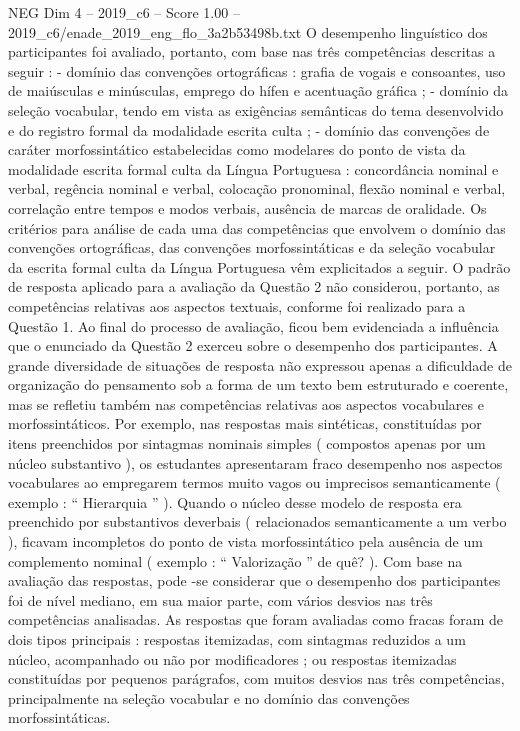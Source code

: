 \begin{textsample}{NEG Dim 4 – 2019\_c6 – Score 1.00 – 2019\_c6/enade\_2019\_eng\_flo\_3a2b53498b.txt}
O desempenho linguístico dos participantes foi avaliado, portanto, com base nas três competências descritas a seguir : - domínio das convenções ortográficas : grafia de vogais e consoantes, uso de maiúsculas e minúsculas, emprego do hífen e acentuação gráfica ; - domínio da seleção vocabular, tendo em vista as exigências semânticas do tema desenvolvido e do registro formal da modalidade escrita culta ; - domínio das convenções de caráter morfossintático estabelecidas como modelares do ponto de vista da modalidade escrita formal culta da Língua Portuguesa : concordância nominal e verbal, regência nominal e verbal, colocação pronominal, flexão nominal e verbal, correlação entre tempos e modos verbais, ausência de marcas de oralidade.
Os critérios para análise de cada uma das competências que envolvem o domínio das convenções ortográficas, das convenções morfossintáticas e da seleção vocabular da escrita formal culta da Língua Portuguesa vêm explicitados a seguir.
O padrão de resposta aplicado para a avaliação da Questão 2 não considerou, portanto, as competências relativas aos aspectos textuais, conforme foi realizado para a Questão 1.
Ao final do processo de avaliação, ficou bem evidenciada a influência que o enunciado da Questão 2 exerceu sobre o desempenho dos participantes.
A grande diversidade de situações de resposta não expressou apenas a dificuldade de organização do pensamento sob a forma de um texto bem estruturado e coerente, mas se refletiu também nas competências relativas aos aspectos vocabulares e morfossintáticos.
Por exemplo, nas respostas mais sintéticas, constituídas por itens preenchidos por sintagmas nominais simples ( compostos apenas por um núcleo substantivo ), os estudantes apresentaram fraco desempenho nos aspectos vocabulares ao empregarem termos muito vagos ou imprecisos semanticamente ( exemplo : “ Hierarquia ” ).
Quando o núcleo desse modelo de resposta era preenchido por substantivos deverbais ( relacionados semanticamente a um verbo ), ficavam incompletos do ponto de vista morfossintático pela ausência de um complemento nominal ( exemplo : “ Valorização ” de quê? ).
Com base na avaliação das respostas, pode -se considerar que o desempenho dos participantes foi de nível mediano, em sua maior parte, com vários desvios nas três competências analisadas.
As respostas que foram avaliadas como fracas foram de dois tipos principais : respostas itemizadas, com sintagmas reduzidos a um núcleo, acompanhado ou não por modificadores ; ou respostas itemizadas constituídas por pequenos parágrafos, com muitos desvios nas três competências, principalmente na seleção vocabular e no domínio das convenções morfossintáticas.

\end{textsample}
